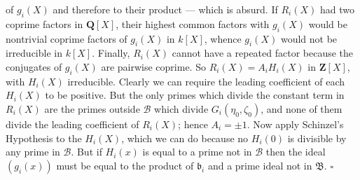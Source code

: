 \documentclass[12pt]{article}
\def\bQ{{\mathbf Q}}
\def\bZ{{\mathbf Z}}
\def\fb{{\mathfrak b}}
\def\fB{{\mathfrak B}}
\def\sB{{\mathcal B}}
\def\qed{{\hfill$\square$}}
\begin{document}
of $g_i(X)$ and therefore to their product --- which is absurd. If
$R_i(X)$ had two coprime factors in $\bQ[X]$, their highest common factors
with $g_i(X)$ would be nontrivial coprime factors of $g_i(X)$ in $k[X]$,
whence $g_i(X)$ would not be irreducible in $k[X]$. Finally, $R_i(X)$ cannot
have a repeated factor because the conjugates of $g_i(X)$ are pairwise
coprime. So $R_i(X)=A_iH_i(X)$ in $\bZ[X]$, with $H_i(X)$ irreducible.
Clearly we can require the leading coefficient of each
$H_i(X)$ to be positive.
But the only primes which divide the constant term in $R_i(X)$ are the primes
outside $\sB$ which divide $G_i(\eta_0,\zeta_0)$, and none of them divide
the leading coefficient of $R_i(X)$; hence $A_i=\pm1$.
Now apply Schinzel's Hypothesis to the $H_i(X)$, which we can do because no
$H_i(0)$ is divisible by any prime in $\sB$.
But if $H_i(x)$ is equal to a prime not in $\sB$ then the ideal $(g_i(x))$
must be equal to the product of $\fb_i$ and a prime ideal not in $\fB$.
\qed

\medskip
\end{document}

